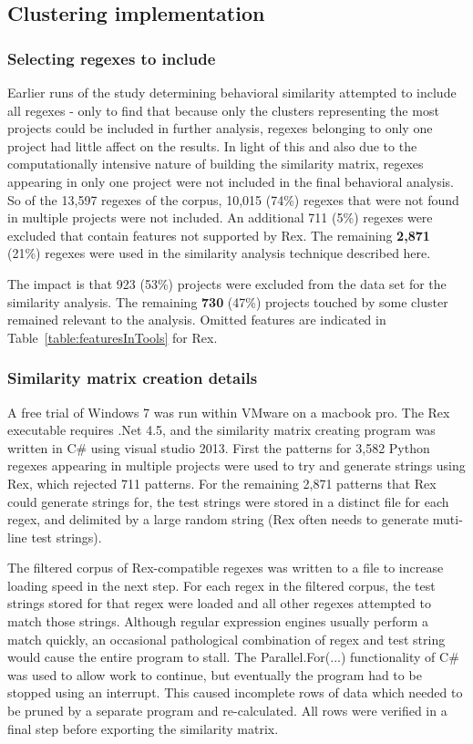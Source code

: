 \subsection{Clustering implementation}

\subsubsection{Selecting regexes to include}
Earlier runs of the study determining behavioral similarity attempted to include all regexes - only to find that because only the clusters representing the most projects could be included in further analysis, regexes belonging to only one project had little affect on the results. In light of this and also due to the computationally intensive nature of building the similarity matrix, regexes appearing in only one project were not included in the final behavioral analysis.  So of the 13,597 regexes of the corpus, 10,015 (74\%) regexes that were not found in multiple projects were not included.
An additional 711 (5\%) regexes were excluded that contain features not supported by Rex.  The remaining \textbf{2,871} (21\%) regexes were used in the similarity analysis technique described here.

The impact is that 923 (53\%) projects were excluded from the data set for the similarity analysis.  The remaining \textbf{730} (47\%) projects touched by some cluster remained relevant to the analysis. Omitted features are indicated in Table~\ref{table:featuresInTools} for Rex.

\subsubsection{Similarity matrix creation details}
A free trial of Windows 7 was run within VMware on a macbook pro.  The Rex~ executable requires .Net 4.5, and the similarity matrix creating program was written in C\# using visual studio 2013.  First the patterns for 3,582 Python regexes appearing in multiple projects were used to try and generate strings using Rex, which rejected 711 patterns.  For the remaining 2,871 patterns that Rex could generate strings for, the test strings were stored in a distinct file for each regex, and delimited by a large random string (Rex often needs to generate muti-line test strings).

The filtered corpus of Rex-compatible regexes was written to a file to increase loading speed in the next step.  For each regex in the filtered corpus, the test strings stored for that regex were loaded and all other regexes attempted to match those strings.  Although regular expression engines usually perform a match quickly, an occasional pathological combination of regex and test string would cause the entire program to stall.  The Parallel.For(...) functionality of C\# was used to allow work to continue, but eventually the program had to be stopped using an interrupt.  This caused incomplete rows of data which needed to be pruned by a separate program and re-calculated.  All rows were verified in a final step before exporting the similarity matrix.

